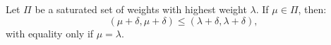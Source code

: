 Let $\Pi$ be a saturated set of weights with highest weight $\lambda$. If $\mu \in \Pi$, then:
$$(\mu + \delta, \mu + \delta) \leq (\lambda + \delta, \lambda + \delta),$$
with equality only if $\mu = \lambda$.